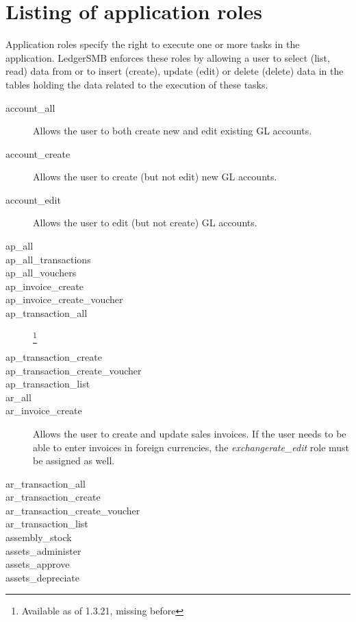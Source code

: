 \chapter{Listing of application roles}
\label{cha:RolesListing}

Application roles specify the right to execute one or more tasks in the application.
LedgerSMB enforces these roles by allowing a user to select (list, read) data from or to
insert (create), update (edit) or delete (delete) data in the tables holding the data
related to the execution of these tasks.

\begin{description}
\item [account\_all] Allows the user to both create new and edit existing GL accounts.
\item [account\_create] Allows the user to create (but not edit) new GL accounts.
\item [account\_edit] Allows the user to edit (but not create) GL accounts.
\item [ap\_all]
\item [ap\_all\_transactions]
\item [ap\_all\_vouchers]
\item [ap\_invoice\_create]
\item [ap\_invoice\_create\_voucher]
\item [ap\_transaction\_all] \footnote{Available as of 1.3.21, missing before}
\item [ap\_transaction\_create]
\item [ap\_transaction\_create\_voucher]
\item [ap\_transaction\_list]
\item [ar\_all]
\item [ar\_invoice\_create] Allows the user to create and update sales invoices. If the
   user needs to be able to enter invoices in foreign currencies, the
   \emph{exchangerate\_edit} role must be assigned as well.
\item [ar\_transaction\_all]
\item [ar\_transaction\_create]
\item [ar\_transaction\_create\_voucher]
\item [ar\_transaction\_list]
\item [assembly\_stock]
\item [assets\_administer]
\item [assets\_approve]
\item [assets\_depreciate]

\end{description}
